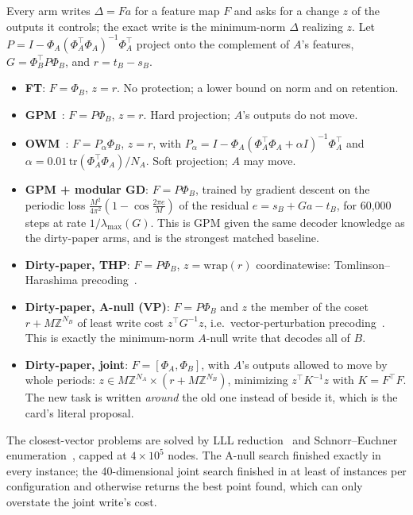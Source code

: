 Every arm writes \(\Delta=Fa\) for a feature map \(F\) and asks for a change \(z\) of the outputs it controls; the exact write is the minimum-norm \(\Delta\) realizing \(z\).
Let \(P=I-\Phi_A(\Phi_A^\top\Phi_A)^{-1}\Phi_A^\top\) project onto the complement of \(A\)'s features, \(G=\Phi_B^\top P\Phi_B\), and \(r=t_B-s_B\).
\begin{itemize}
  \item \textbf{FT}: \(F=\Phi_B\), \(z=r\). No protection; a lower bound on norm and on retention.
  \item \textbf{GPM}~\citep{saha2021gpm}: \(F=P\Phi_B\), \(z=r\). Hard projection; \(A\)'s outputs do not move.
  \item \textbf{OWM}~\citep{zeng2019owm}: \(F=P_\alpha\Phi_B\), \(z=r\), with \(P_\alpha=I-\Phi_A(\Phi_A^\top\Phi_A+\alpha I)^{-1}\Phi_A^\top\) and \(\alpha=0.01\,\mathrm{tr}(\Phi_A^\top\Phi_A)/N_A\). Soft projection; \(A\) may move.
  \item \textbf{GPM + modular GD}: \(F=P\Phi_B\), trained by gradient descent on the periodic loss \(\tfrac{M^2}{4\pi^2}(1-\cos\tfrac{2\pi e}{M})\) of the residual \(e=s_B+G a-t_B\), for 60{,}000 steps at rate \(1/\lambda_{\max}(G)\).
  This is GPM given the same decoder knowledge as the dirty-paper arms, and is the strongest matched baseline.
  \item \textbf{Dirty-paper, THP}: \(F=P\Phi_B\), \(z=\mathrm{wrap}(r)\) coordinatewise: Tomlinson--Harashima precoding~\citep{tomlinson1971,harashima1972}.
  \item \textbf{Dirty-paper, A-null (VP)}: \(F=P\Phi_B\) and \(z\) the member of the coset \(r+M\mathbb Z^{N_B}\) of least write cost \(z^\top G^{-1}z\), i.e.\ vector-perturbation precoding~\citep{hochwald2005vp}.
  This is exactly the minimum-norm \(A\)-null write that decodes all of \(B\).
  \item \textbf{Dirty-paper, joint}: \(F=[\Phi_A,\Phi_B]\), with \(A\)'s outputs allowed to move by whole periods: \(z\in M\mathbb Z^{N_A}\times(r+M\mathbb Z^{N_B})\), minimizing \(z^\top K^{-1}z\) with \(K=F^\top F\).
  The new task is written \emph{around} the old one instead of beside it, which is the card's literal proposal.
\end{itemize}
The closest-vector problems are solved by LLL reduction~\citep{lenstra1982lll} and Schnorr--Euchner enumeration~\citep{agrell2002closest}, capped at \(4\times10^5\) nodes.
The A-null search finished exactly in every instance; the 40-dimensional joint search finished in at least \cvpexact{} of instances per configuration and otherwise returns the best point found, which can only overstate the joint write's cost.

